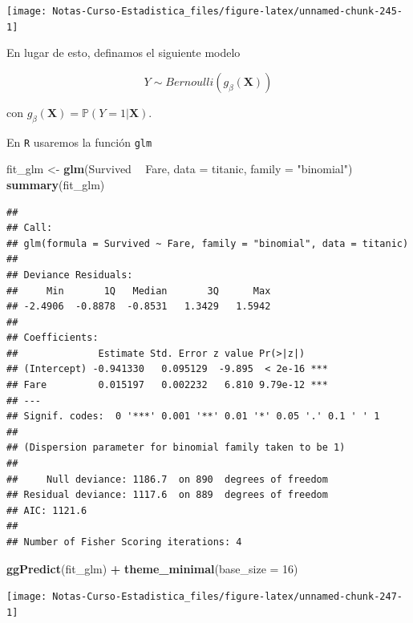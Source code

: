 \documentclass[
  12pt,
]{book}
\newenvironment{Shaded}{\begin{snugshade}}{\end{snugshade}}
\newcommand{\DataTypeTok}[1]{\textcolor[rgb]{0.13,0.29,0.53}{#1}}
\newcommand{\DecValTok}[1]{\textcolor[rgb]{0.00,0.00,0.81}{#1}}
\newcommand{\KeywordTok}[1]{\textcolor[rgb]{0.13,0.29,0.53}{\textbf{#1}}}
\newcommand{\NormalTok}[1]{#1}
\newcommand{\OperatorTok}[1]{\textcolor[rgb]{0.81,0.36,0.00}{\textbf{#1}}}
\newcommand{\StringTok}[1]{\textcolor[rgb]{0.31,0.60,0.02}{#1}}
\theoremstyle{definition}
\theoremstyle{definition}
\theoremstyle{definition}
\theoremstyle{remark}
\begin{document}
\begin{center}\texttt{[image: Notas-Curso-Estadistica\_files/figure-latex/unnamed-chunk-245-1]} \end{center}

En lugar de esto, definamos el siguiente modelo

\begin{equation*}
Y \sim Bernoulli (g_{\beta}(\boldsymbol{X})) 
\end{equation*}

con \(g_{\beta}(\boldsymbol{X}) = \mathbb{P}\left(Y=1 \vert \boldsymbol{X}\right)\).

En \texttt{R} usaremos la función \texttt{glm}

\begin{Shaded}
\begin{Highlighting}[]
\NormalTok{fit_glm <-}\StringTok{ }\KeywordTok{glm}\NormalTok{(Survived }\OperatorTok{~}\StringTok{ }\NormalTok{Fare, }\DataTypeTok{data =}\NormalTok{ titanic, }\DataTypeTok{family =} \StringTok{"binomial"}\NormalTok{)}
\KeywordTok{summary}\NormalTok{(fit_glm)}
\end{Highlighting}
\end{Shaded}

\begin{verbatim}
## 
## Call:
## glm(formula = Survived ~ Fare, family = "binomial", data = titanic)
## 
## Deviance Residuals: 
##     Min       1Q   Median       3Q      Max  
## -2.4906  -0.8878  -0.8531   1.3429   1.5942  
## 
## Coefficients:
##              Estimate Std. Error z value Pr(>|z|)    
## (Intercept) -0.941330   0.095129  -9.895  < 2e-16 ***
## Fare         0.015197   0.002232   6.810 9.79e-12 ***
## ---
## Signif. codes:  0 '***' 0.001 '**' 0.01 '*' 0.05 '.' 0.1 ' ' 1
## 
## (Dispersion parameter for binomial family taken to be 1)
## 
##     Null deviance: 1186.7  on 890  degrees of freedom
## Residual deviance: 1117.6  on 889  degrees of freedom
## AIC: 1121.6
## 
## Number of Fisher Scoring iterations: 4
\end{verbatim}

\begin{Shaded}
\begin{Highlighting}[]
\KeywordTok{ggPredict}\NormalTok{(fit_glm) }\OperatorTok{+}\StringTok{ }\KeywordTok{theme_minimal}\NormalTok{(}\DataTypeTok{base_size =} \DecValTok{16}\NormalTok{)}
\end{Highlighting}
\end{Shaded}

\begin{center}\texttt{[image: Notas-Curso-Estadistica\_files/figure-latex/unnamed-chunk-247-1]} \end{center}
\end{document}
